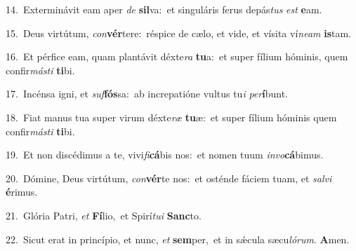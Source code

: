 {\numbfont\textcolor{\numbcolor}{14.}}~Exterminávit eam aper \textit{de} \textbf{sil}\-va:~\star et singuláris ferus depás\textit{tus} \textit{est} \textbf{e}\-am.\par
{\numbfont\textcolor{\numbcolor}{15.}}~Deus virtútum, \textit{con}\-\textbf{vér}tere:~\star réspice de cælo, et vide, et vísita ví\-\textit{ne}\-\textit{am} \textbf{is}\-tam.\par
{\numbfont\textcolor{\numbcolor}{16.}}~Et pérfice eam, quam plantávit déxte\textit{ra} \textbf{tu}\-a:~\star et super fílium hóminis, quem confir\-\textit{más}\-\textit{ti} \textbf{ti}\-bi.\par
{\numbfont\textcolor{\numbcolor}{17.}}~Incénsa igni, et \textit{suf}\-\textbf{fós}sa:~\star ab increpatióne vultus tu\textit{i} \textit{per}\-\textbf{í}bunt.\par
{\numbfont\textcolor{\numbcolor}{18.}}~Fiat manus tua super virum déxte\textit{ræ} \textbf{tu}\-æ:~\star et super fílium hóminis quem confir\-\textit{más}\-\textit{ti} \textbf{ti}\-bi.\par
{\numbfont\textcolor{\numbcolor}{19.}}~Et non discédimus a te, vivi\-\textit{fi}\-\textbf{cá}bis nos:~\star et nomen tuum \textit{in}\-\textit{vo}\textbf{cá}bimus.\par
{\numbfont\textcolor{\numbcolor}{20.}}~Dómine, Deus virtútum, \textit{con}\-\textbf{vér}te nos:~\star et osténde fáciem tuam, et \textit{sal}\-\textit{vi} \textbf{é}\-rimus.\par
{\numbfont\textcolor{\numbcolor}{21.}}~Glória Patri, \textit{et} \textbf{Fí}\-lio,~\star et Spirí\-\textit{tu}\-\textit{i} \textbf{Sanc}\-to.\par
{\numbfont\textcolor{\numbcolor}{22.}}~Sicut erat in princípio, et nunc, \textit{et} \textbf{sem}\-per,~\star et in sǽcula sæcu\-\textit{ló}\-\textit{rum}. \textbf{A}\-men.\par
